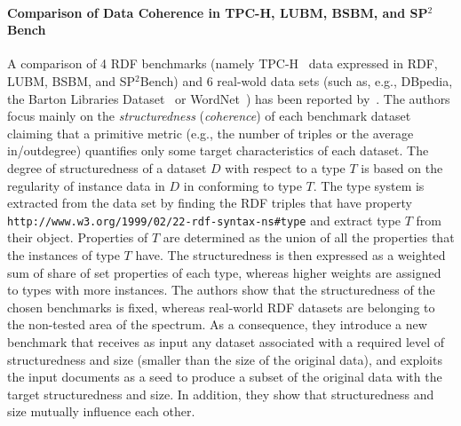 \paragraph{Comparison of Data Coherence in TPC-H, LUBM, BSBM, and SP$^2$Bench}  A comparison of 4 RDF benchmarks (namely TPC-H~\cite{TPC-H} data expressed in RDF, LUBM, BSBM, and SP$^2$Bench) and 6 real-wold data sets (such as, e.g.,  DBpedia, the Barton Libraries Dataset~\cite{barton-benchmark} or
WordNet~\cite{Miller:1995:WLD:219717.219748}) has been reported by~\cite{Duan:2011:AOC:1989323.1989340}. The authors focus mainly on the  \emph{structuredness} (\emph{coherence}) of each benchmark dataset claiming that a primitive metric (e.g., the number of triples or the average in/outdegree) quantifies only some target characteristics of each dataset. The degree of structuredness of a dataset $D$ with respect to a type $T$ is based on  the regularity of instance data in $D$ in conforming to type $T$. The type system is extracted from the data set by finding the RDF triples that have property  \texttt{http://www.w3.org/1999/02/22-rdf-syntax-ns\#type} and extract type $T$ from their object. Properties of $T$ are determined as the union of all the properties that the instances of type $T$ have. The structuredness is then expressed as a weighted sum of share of set properties of each type, whereas higher weights are assigned to types with more instances. The authors show that the structuredness of the chosen benchmarks is fixed, whereas real-world RDF datasets are belonging to the non-tested area of the spectrum. As a consequence, they introduce a new benchmark that receives as input any dataset associated with a required level of structuredness and size (smaller than the size of the original data), and exploits the input documents as a seed to produce a subset of the original data with the target structuredness and size. In addition, they show that structuredness and size mutually influence each other.


